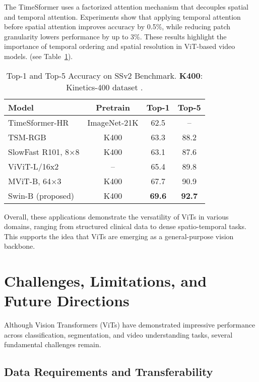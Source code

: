 \documentclass[conference]{IEEEtran}
\begin{document}
The TimeSformer \cite{bertasius2021space} uses a factorized attention mechanism that decouples spatial and temporal attention. Experiments show that applying temporal attention before spatial attention improves accuracy by 0.5\%, while reducing patch granularity lowers performance by up to 3\%. These results highlight the importance of temporal ordering and spatial resolution in ViT-based video models. (see Table~\ref{tab:video}).

\begin{table}[ht]
\caption{Top-1 and Top-5 Accuracy on SSv2 Benchmark. \textbf{K400}: Kinetics-400 dataset \cite{kay2017kinetics}.\cite{liu2022videoswin, bertasius2021space}}
\label{tab:video}
\centering
\begin{tabular}{lccc}
\toprule
\textbf{Model} & \textbf{Pretrain} & \textbf{Top-1} & \textbf{Top-5} \\
\midrule
TimeSformer-HR \cite{bertasius2021space}        & ImageNet-21K & 62.5 & – \\
TSM-RGB \cite{lin2019tsm}              & K400         & 63.3 & 88.2 \\
SlowFast R101, 8×8 \cite{feichtenhofer2019slowfast}   & K400         & 63.1 & 87.6 \\
ViViT-L/16x2 \cite{arnab2021vivit}         & –            & 65.4 & 89.8 \\
MViT-B, 64×3 \cite{fan2021multiscale}         & K400         & 67.7 & 90.9 \\
Swin-B (proposed)     & K400         & \textbf{69.6} & \textbf{92.7} \\
\bottomrule
\end{tabular}
\end{table}


Overall, these applications demonstrate the versatility of ViTs in various domains, ranging from structured clinical data to dense spatio-temporal tasks. This supports the idea that ViTs are emerging as a general-purpose vision backbone.

\section{Challenges, Limitations, and Future Directions}

Although Vision Transformers (ViTs) have demonstrated impressive performance across classification, segmentation, and video understanding tasks, several fundamental challenges remain.

\subsection{Data Requirements and Transferability}
\end{document}
